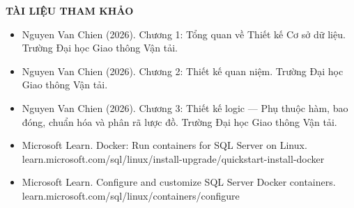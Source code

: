 
\clearpage
{}
{}
{\LARGE\bfseries TÀI LIỆU THAM KHẢO}\par\vspace{1em}

\begin{itemize}
\item Nguyen Van Chien (2026). Chương 1: Tổng quan về Thiết kế Cơ sở dữ liệu. Trường Đại học Giao thông Vận tải.
\item Nguyen Van Chien (2026). Chương 2: Thiết kế quan niệm. Trường Đại học Giao thông Vận tải.
\item Nguyen Van Chien (2026). Chương 3: Thiết kế logic — Phụ thuộc hàm, bao đóng, chuẩn hóa và phân rã lược đồ. Trường Đại học Giao thông Vận tải.
\item Microsoft Learn. Docker: Run containers for SQL Server on Linux. learn.microsoft.com/sql/linux/install-upgrade/quickstart-install-docker
\item Microsoft Learn. Configure and customize SQL Server Docker containers. learn.microsoft.com/sql/linux/containers/configure
\end{itemize}